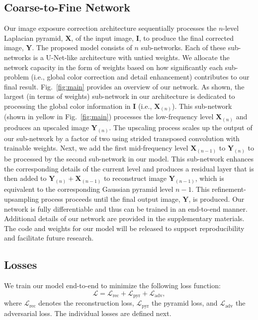 \documentclass[final]{cvpr}
\begin{document}
\subsection{Coarse-to-Fine Network} \label{subsec:network}
Our image exposure correction architecture sequentially processes the $n$-level Laplacian pyramid, $\mathbf{X}$, of the input image, $\mathbf{I}$, to produce the final corrected image, $\mathbf{Y}$. The proposed model consists of $n$ sub-networks. Each of these sub-networks is a U-Net-like architecture \cite{unet} with untied weights. We allocate the network capacity in the form of weights based on how significantly each sub-problem (i.e., global color correction and detail enhancement) contributes to our final result.
Fig.\ \ref{fig:main} provides an overview of our network. As shown, the largest (in terms of weights) sub-network in our architecture is dedicated to processing the global color information in $\mathbf{I}$ (i.e., $\mathbf{X}_{(n)}$). This sub-network (shown in yellow in Fig.\ \ref{fig:main}) processes the low-frequency level $\mathbf{X}_{(n)}$ and produces an upscaled image $\mathbf{Y}_{(n)}$. The upscaling process scales up the output of our sub-network by a factor of two using strided transposed convolution with trainable weights. Next, we add the first mid-frequency level $\mathbf{X}_{(n-1)}$ to $\mathbf{Y}_{(n)}$ to be processed by the second sub-network in our model. This sub-network enhances the corresponding details of the current level and produces a residual layer that is then added to $\mathbf{Y}_{(n)} + \mathbf{X}_{(n-1)}$ to reconstruct image $\mathbf{Y}_{(n-1)}$, which is equivalent to the corresponding Gaussian pyramid level $n-1$. This refinement-upsampling process proceeds until the final output image, $\mathbf{Y}$, is produced. Our network is fully differentiable and thus can be trained in an end-to-end manner.
Additional details of our network are provided in the supplementary materials.
The code and weights for our model will be released to support reproducibility and facilitate future research.





\subsection{Losses}\label{subsec:losses}

We train our model end-to-end to minimize the following loss function:
\begin{equation}
\label{eq:final_loss}
\mathcal{L} = \mathcal{L}_{\text{rec}} + \mathcal{L}_{\text{pyr}} + \mathcal{L}_{\text{adv}},
\end{equation}
where  $\mathcal{L}_{\text{rec}}$ denotes the reconstruction loss, $\mathcal{L}_{\text{pyr}}$ the pyramid loss, and $\mathcal{L}_{\text{adv}}$ the adversarial loss. The individual losses are defined next.
\end{document}
